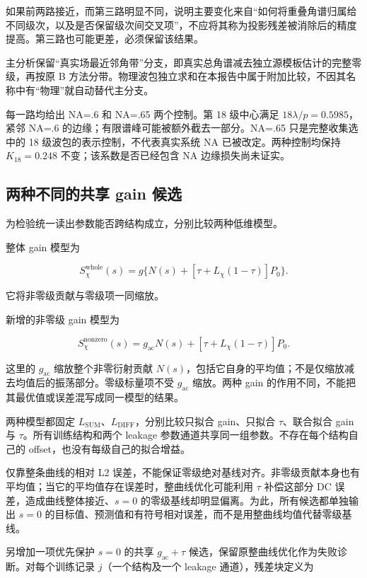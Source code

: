 \documentclass[
  chinese,
  UTF8,
  a4paper,
  11pt]{ctexart}
\begin{document}
如果前两路接近，而第三路明显不同，说明主要变化来自``如何将重叠角谱归属给不同级次，以及是否保留级次间交叉项''，不应将其称为投影残差被消除后的精度提高。第三路也可能更差，必须保留该结果。

主分析保留``真实场最近邻角带''分支，即真实总角谱减去独立源模板估计的完整零级，再按原
B
方法分带。物理波包独立求和在本报告中属于附加比较，不因其名称中有``物理''就自动替代主分支。

每一路均给出 NA=.6 和 NA=.65 两个控制。第 18 级中心满足
\(18\lambda/p=0.5985\)，紧邻 NA=.6
的边缘；有限谱峰可能被额外截去一部分。NA=.65 只是完整收集选中的 18
级波包的表示控制，不代表真实系统 NA 已被改定。两种控制均保持
\(K_{18}=0.248\) 不变；该系数是否已经包含 NA 边缘损失尚未证实。

\subsection{两种不同的共享 gain
候选}\label{ux4e24ux79cdux4e0dux540cux7684ux5171ux4eab-gain-ux5019ux9009}

为检验统一读出参数能否跨结构成立，分别比较两种低维模型。

整体 gain 模型为

\[
S_\chi^{\mathrm{whole}}(s)
=g\{N(s)+[\tau+L_\chi(1-\tau)]P_0\}.
\]

它将非零级贡献与零级项一同缩放。

新增的非零级 gain 模型为

\[
S_\chi^{\mathrm{nonzero}}(s)
=g_{\mathrm{ac}}N(s)+[\tau+L_\chi(1-\tau)]P_0.
\]

这里的 \(g_{\mathrm{ac}}\) 缩放整个非零衍射贡献
\(N(s)\)，包括它自身的平均值；不是仅缩放减去均值后的振荡部分。零级标量项不受
\(g_{\mathrm{ac}}\) 缩放。两种 gain
的作用不同，不能把其最优值或误差混写成同一模型的结果。

两种模型都固定
\(L_{\mathrm{SUM}}\)、\(L_{\mathrm{DIFF}}\)，分别比较只拟合 gain、只拟合
\(\tau\)、联合拟合 gain 与 \(\tau\)。所有训练结构和两个 leakage
参数通道共享同一组参数。不存在每个结构自己的
offset，也没有每级自己的拟合增益。

仅靠整条曲线的相对 L2
误差，不能保证零级绝对基线对齐。非零级贡献本身也有平均值；当它的平均值存在误差时，整曲线优化可能利用
\(\tau\) 补偿这部分 DC 误差，造成曲线整体接近、\(s=0\)
的零级基线却明显偏离。为此，所有候选都单独输出 \(s=0\)
的目标值、预测值和有符号相对误差，而不是用整曲线均值代替零级基线。

另增加一项优先保护 \(s=0\) 的共享 \(g_{\mathrm{ac}}+\tau\)
候选，保留原整曲线优化作为失败诊断。对每个训练记录 \(j\)（一个结构及一个
leakage 通道），残差块定义为
\end{document}
